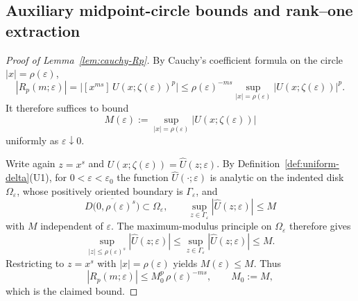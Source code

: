 \documentclass[11pt]{amsart}
\numberwithin{equation}{section}
\theoremstyle{plain}
\theoremstyle{definition}
\theoremstyle{remark}
\begin{document}
\subsection{Auxiliary midpoint-circle bounds and rank--one extraction}
\label{app:rank-one-proof}

\begin{proof}[Proof of Lemma~\ref{lem:cauchy-Rp}]
By Cauchy's coefficient formula on the circle \(|x|=\rho(\varepsilon)\),
\[
|R_p(m;\varepsilon)|
=
\bigl|[x^{ms}]\,U(x;\zeta(\varepsilon))^p\bigr|
\le
\rho(\varepsilon)^{-ms}
\sup_{|x|=\rho(\varepsilon)}|U(x;\zeta(\varepsilon))|^p .
\]
It therefore suffices to bound
\[
M(\varepsilon):=\sup_{|x|=\rho(\varepsilon)}|U(x;\zeta(\varepsilon))|
\]
uniformly as \(\varepsilon\downarrow0\).

Write again \(z=x^s\) and \(U(x;\zeta(\varepsilon))=\widehat U(z;\varepsilon)\).
By Definition~\ref{def:uniform-delta}\textup{(U1)}, for
\(0<\varepsilon<\varepsilon_0\) the function \(\widehat U(\cdot;\varepsilon)\)
is analytic on the indented disk \(\Omega_\varepsilon\), whose positively
oriented boundary is \(\Gamma_\varepsilon\), and
\[
\overline{D\bigl(0,\rho(\varepsilon)^s\bigr)}\subset \Omega_\varepsilon,
\qquad
\sup_{z\in\Gamma_\varepsilon}|\widehat U(z;\varepsilon)|\le M
\]
with \(M\) independent of \(\varepsilon\). The maximum-modulus principle on
\(\Omega_\varepsilon\) therefore gives
\[
\sup_{|z|\le \rho(\varepsilon)^s}|\widehat U(z;\varepsilon)|
\le
\sup_{z\in\Gamma_\varepsilon}|\widehat U(z;\varepsilon)|
\le M.
\]
Restricting to \(z=x^s\) with \(|x|=\rho(\varepsilon)\) yields
\(M(\varepsilon)\le M\). Thus
\[
|R_p(m;\varepsilon)|\le M_0^p\,\rho(\varepsilon)^{-ms},
\qquad
M_0:=M,
\]
which is the claimed bound.
\end{proof}
\end{document}
